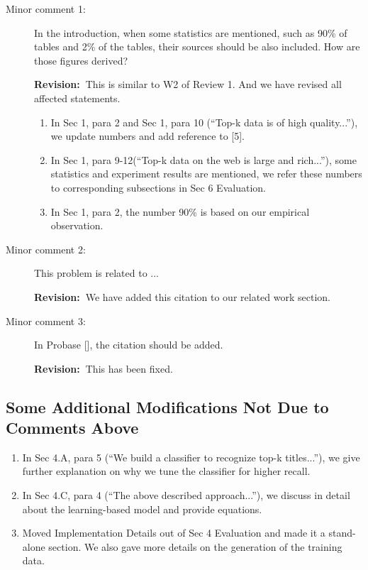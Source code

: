 \documentclass[11pt]{article}
\newcommand{\rv}{\textbf{Revision:~}}
\begin{document}
\begin{description}
\item [Minor comment 1:]
In the introduction, when some statistics are mentioned, such as 90\% of
tables and 2\% of the tables, their sources should be also included. How are
those figures derived?

\rv This is similar to W2 of Review 1. And we have revised
all affected statements.
\begin{enumerate}
 \item In Sec 1, para 2 and Sec 1, para 10 (``Top-k data is of high quality...''),
    we update numbers and add reference to [5].
 \item In Sec 1, para 9-12(``Top-k data on the
 web is large and rich...''), some statistics and experiment results are
 mentioned, we refer these numbers to corresponding subsections in
 Sec 6 Evaluation.
 \item In Sec 1, para 2, the number 90\% is based on our empirical
 observation.
\end{enumerate}

\item [Minor comment 2:] This problem is related to ...

\rv We have added this citation to our related work section.

\item[Minor comment 3:] In Probase [], the citation should be added.

\rv This has been fixed.
\end{description}

\subsection*{Some Additional Modifications Not Due to Comments Above}

\begin{enumerate}
\item In Sec 4.A, para 5 (``We build a classifier to recognize top-k
titles...''), we give further explanation on why we tune the
classifier for higher recall.

\item In Sec 4.C, para 4 (``The above described approach...''), we
discuss in detail about the learning-based model and provide
equations.

\item Moved Implementation Details out of Sec 4 Evaluation and made it a
stand-alone section. We also gave more details on the generation of the
training data.
\end{enumerate}
\end{document}
